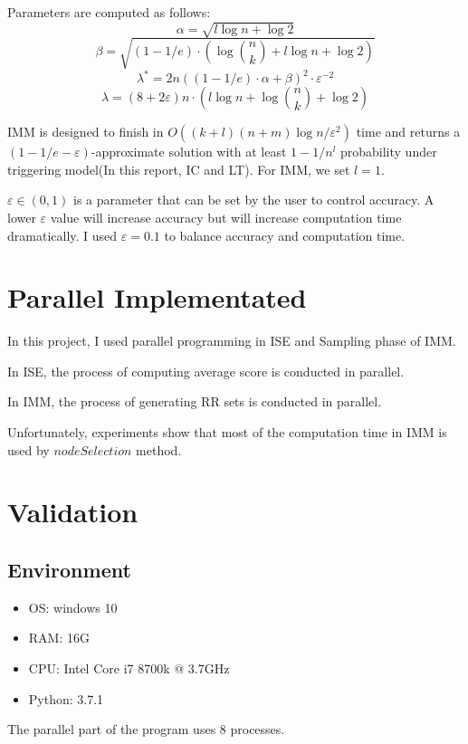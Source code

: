\documentclass[conference]{IEEEtran}
\begin{document}
Parameters are computed as follows:
\begin{equation}
\alpha = \sqrt{l \log n+\log 2} 
\end{equation}
\begin{equation}
\beta = \sqrt{(1-1/e)\cdot (\log {n\choose k}+l\log n + \log 2)}
\end{equation}
\begin{equation}
\lambda^* = 2n((1-1/e)\cdot \alpha + \beta)^2\cdot\varepsilon^{-2}
\end{equation}    
\begin{equation}
\lambda = (8+2\varepsilon)n\cdot(l\log n+\log{n\choose k}+\log2)
\end{equation}

IMM is designed to finish in $O((k+l)(n+m)\log n/\varepsilon^2)$ time and returns a $(1-1/e-\varepsilon)$-approximate solution with at least $1-1/n^l$ probability under triggering model(In this report, IC and LT)\cite{Kempe:2003:MSI:956750.956769}. For IMM, we set $l = 1$.

$\varepsilon \in (0,1)$ is a parameter that can be set by the user to control accuracy. A lower $\varepsilon$ value will increase accuracy but will increase computation time dramatically. I used $\varepsilon = 0.1 $ to balance accuracy and computation time.

\section {Parallel Implementated}
In this project, I used parallel programming in ISE and Sampling phase of IMM.

In ISE, the process of computing average score is conducted in parallel.

In IMM, the process of generating RR sets is conducted in parallel.

Unfortunately, experiments show that most of the computation time in IMM is used by $nodeSelection$ method.

\section{Validation}
\subsection{Environment}     
\begin{itemize}
    \item OS: windows 10
    \item RAM: 16G
    \item CPU: Intel Core i7 8700k @ 3.7GHz
    \item Python: 3.7.1
\end{itemize}
The parallel part of the program uses 8 processes.
\end{document}

